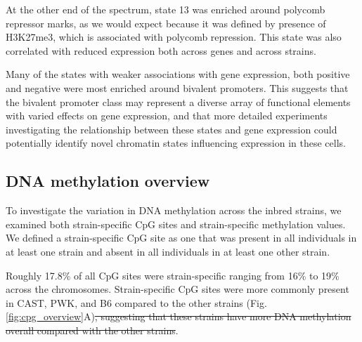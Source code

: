 \documentclass[
  11pt,
]{article}
\providecommand{\DIFdeltex}[1]{{\protect\color{red}\sout{#1}}}                      %
\providecommand{\DIFdelbegin}{} %
\providecommand{\DIFdelend}{} %
\providecommand{\DIFdel}[1]{\texorpdfstring{\DIFdeltex{#1}}{}} %
\newcommand{\DIFscaledelfig}{0.5}
\newlength{\DIFdelgraphicswidth} %
\newlength{\DIFdelgraphicsheight} %
\newcommand{\DIFdelincludegraphics}[2][]{%
\sbox{\DIFdelgraphicsbox}{\DIFOincludegraphics[#1]{#2}}%
\settoboxwidth{\DIFdelgraphicswidth}{\DIFdelgraphicsbox} %
\settoboxtotalheight{\DIFdelgraphicsheight}{\DIFdelgraphicsbox} %
\scalebox{\DIFscaledelfig}{%
\parbox[b]{\DIFdelgraphicswidth}{\usebox{\DIFdelgraphicsbox}\\[-\baselineskip] \rule{\DIFdelgraphicswidth}{0em}}\llap{\resizebox{\DIFdelgraphicswidth}{\DIFdelgraphicsheight}{%
\setlength{\unitlength}{\DIFdelgraphicswidth}%
\begin{picture}(1,1)%
\thicklines\linethickness{2pt} %
{\color[rgb]{1,0,0}\put(0,0){\framebox(1,1){}}}%
{\color[rgb]{1,0,0}\put(0,0){\line( 1,1){1}}}%
{\color[rgb]{1,0,0}\put(0,1){\line(1,-1){1}}}%
\end{picture}%
}\hspace*{3pt}}} %
} %
\DeclareRobustCommand{\DIFdelbegin}{\DIFOdelbegin \let\includegraphics\DIFdelincludegraphics} %
\DeclareRobustCommand{\DIFdelend}{\DIFOaddend \let\includegraphics\DIFOincludegraphics} %
\begin{document}
At the other end of the spectrum, state 13 was enriched around polycomb
repressor marks, as we would expect because it was defined by presence
of H3K27me3, which is associated with polycomb repression. This state
was also correlated with reduced expression both across genes and across
strains.

Many of the states with weaker associations with gene expression, both
positive and negative were most enriched around bivalent promoters. This
suggests that the bivalent promoter class may represent a diverse array
of functional elements with varied effects on gene expression, and that
more detailed experiments investigating the relationship between these
states and gene expression could potentially identify novel chromatin
states influencing expression in these cells.

\hypertarget{dna-methylation-overview}{%
\subsection{DNA methylation overview}\label{dna-methylation-overview}}

To investigate the variation in DNA methylation across the inbred
strains, we examined both strain-specific CpG sites and strain-specific
methylation values. We defined a strain-specific CpG site as one that
was present in all individuals in at least one strain and absent in all
individuals in at least one other strain.

Roughly 17.8\% of all CpG sites were strain-specific ranging from 16\%
to 19\% across the chromosomes. Strain-specific CpG sites were more
commonly present in CAST, PWK, and B6 compared to the other strains
(Fig. \ref{fig:cpg_overview}A)\DIFdelbegin \DIFdel{, suggesting that these strains have more
DNA methylation overall compared with the other strains}\DIFdelend .
\end{document}
